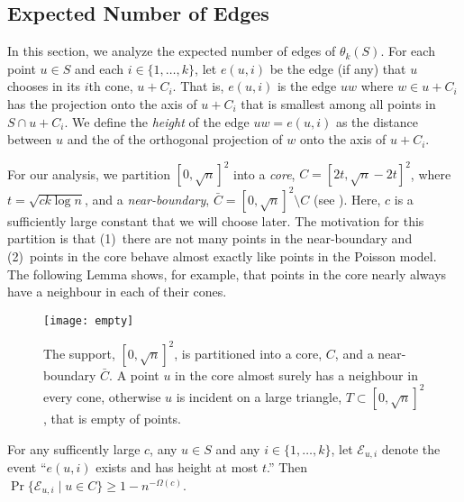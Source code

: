 \documentclass{patmorin}
\begin{document}
\subsection{Expected Number of Edges}

In this section, we analyze the expected number of edges of $\theta_k(S)$.
For each point $u\in S$ and each $i\in\{1,\ldots,k\}$, let $e(u,i)$ be
the edge (if any) that $u$ chooses in its $i$th cone, $u+C_i$.  That is,
$e(u,i)$ is the edge $uw$ where $w\in u+C_i$ has the projection onto
the axis of $u+C_i$ that is smallest among all points in $S\cap u+C_i$.
We define the \emph{height} of the edge $uw=e(u,i)$ as the distance
between $u$ and the of the orthogonal projection of $w$ onto the axis
of $u+C_i$.

For our analysis, we partition $[0,\sqrt{n}]^2$ into a
\emph{core}, $C=[2t,\sqrt{n}-2t]^2$, where $t=\sqrt{ck\log n}$,
and a \emph{near-boundary}, $\bar{C}=[0,\sqrt{n}]^2\setminus C$ (see
).  Here, $c$ is a sufficiently large constant that we will
choose later.  The motivation for this partition is that (1)~there are not
many points in the near-boundary and (2)~points in the core behave almost
exactly like points in the Poisson model.  The following Lemma shows,
for example, that points in the core nearly always have a neighbour in
each of their cones.

\begin{figure}
  \begin{center}
    \texttt{[image: empty]}
  \end{center}
  \caption{The support, $[0,\sqrt{n}]^2$, is partitioned into a core, $C$,
    and a near-boundary $\bar{C}$.  A point $u$ in the core almost surely
    has a neighbour in every cone, otherwise $u$ is incident on a large
    triangle, $T\subset [0,\sqrt{n}]^2$, that is empty of points.}
\end{figure}

\newcommand{\eui}{\mathcal{E}_{u,i}}
\newcommand{\neui}{\bar{\mathcal{E}}_{u,i}}

\begin{lem}
  For any sufficently large $c$, any $u\in S$ and any
  $i\in\{1,\ldots,k\}$, let $\eui$ denote the event ``$e(u,i)$ exists
  and has height at most $t$.''  Then $\Pr\{\eui\mid u\in C\} \ge
  1-n^{-\Omega(c)}$.
\end{lem}
\end{document}
